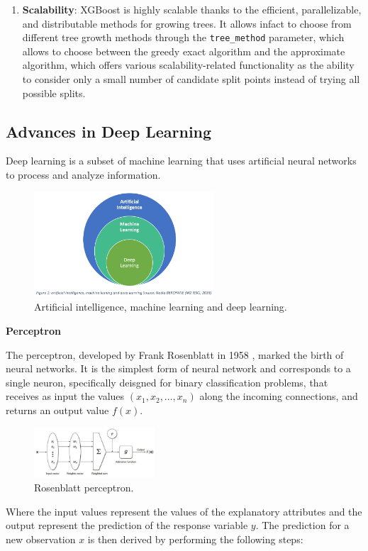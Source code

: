 \begin{enumerate}
    \item \textbf{Scalability}: XGBoost is highly scalable thanks to the efficient, parallelizable, and distributable methods for growing trees. It allows infact to choose from different tree growth methods through the \texttt{tree\_method} parameter, which allows to choose between the greedy exact algorithm and the approximate algorithm, which offers various scalability-related functionality as the ability to consider only a small number of candidate split points instead of trying all possible splits. 
        
\end{enumerate} 


\subsection{Advances in Deep Learning} %
Deep learning is a subset of machine learning that uses artificial neural networks to process and analyze information. 
\begin{figure}[H] 
    \centering
    \includegraphics[width=0.6\textwidth]{Machine_learning_thesis/Images/deep learning and machine learning.png}
    \caption{Artificial intelligence, machine learning and deep learning.} 
    \label{fig:Artificial intelligence, machine learning and deep learning} 
\end{figure}

\textbf{Perceptron}

The perceptron, developed by Frank Rosenblatt in 1958 \cite{rosenblatt1958perceptron}, marked the birth of neural networks. It is the simplest form of neural network and corresponds to a single neuron, specifically deisgned for binary classification problems, that receives as input the values $(x_1, x_2, \dots, x_n)$ along the incoming connections, and returns an output value $f(x)$.
\begin{figure}[H] 
    \centering
    \includegraphics[width=0.4\textwidth]{Machine_learning_thesis/Images/Rosenblatt perceptron.png}
    \caption{Rosenblatt perceptron.} 
    \label{fig:Rosenblatt perceptron} 
\end{figure}
Where the input values represent the values of the explanatory attributes and the output represent the prediction of the response variable $y$. The prediction for a new observation $x$ is then derived by performing the following steps:

